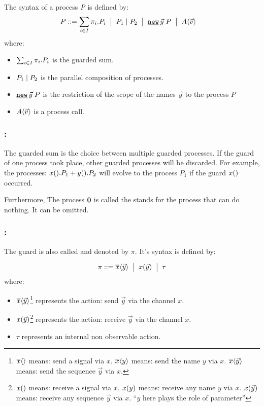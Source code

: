 \begin{definition}
\label{def_process_syntax}
The syntax of a \picalc{} process \textit{P} is defined by: 
\begin{align*}
 P & \syntdef \procsum \ebnf \procpar{P_1}{P_2} \ebnf \procres{\vec{y}}{P} \ebnf \proccall{A}{\vec{v}}
\end{align*}
where:
\begin{itemize}
\item $\sum_{i\in I}{\pi_i.P_i}$ is the guarded sum.
\item $P_1 \mid P_2$ is the parallel composition of processes.
\item $\procres{\vec{y}}{P}$ is the restriction of the scope of the names $\vec{y}$ to the process $P$
\item $A\langle\vec{v}\rangle$ is a process call. 
\end{itemize}
\end{definition}

\subsubsection{:} The guarded sum is the choice between multiple guarded processes. If the guard of one process took place, other guarded processes will be discarded. For example, the processes: $x().P_1 + y().P_2$ will evolve to the process $P_1$ if the guard $x()$ occurred.

Furthermore, The process $\mathbf{0}$ is called the  stands for the process that can do nothing. It can be omitted.
\subsubsection{:} The guard is also called  and denoted by $\pi$. It's syntax is defined by:
\begin{definition}
\label{def_prefix_syntax}
\begin{align*}
 \pi ::= \overline{x}\langle\vec{y}\rangle \;\bigm|\; x(\vec{y}) \;\bigm|\; \tau
\end{align*}
where:
\begin{itemize}
\item $\overline{x}\langle\vec{y}\rangle$\footnote{$\overline{x}\langle{}\rangle$ means: send a signal via $x$. $\overline{x}\langle{y}\rangle$ means: send the name $y$ via $x$.  $\overline{x}\langle{\vec{y}}\rangle$ means: send the sequence $\vec{y}$ via $x$.} represents the action: send $\vec{y}$ via the channel $x$.
\item $x(\vec{y})$\footnote{$x({})$ means: receive a signal via $x$. $x({y})$ means: receive any name $y$ via $x$.  $x({\vec{y}})$ means: receive any sequence $\vec{y}$ via $x$. ``$y$ here plays the role of parameter''} represents the action: receive $\vec{y}$ via the channel $x$.
\item $\tau$ represents an internal non observable action.
\end{itemize}
\end{definition}

